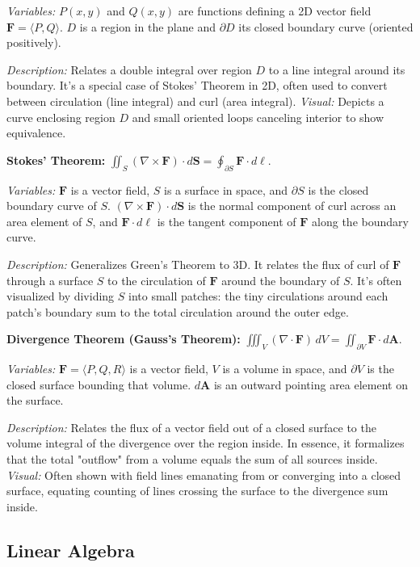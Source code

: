 \documentclass{article}
\begin{document}
\textit{Variables:} $P(x,y)$ and $Q(x,y)$ are functions defining a 2D vector field $\mathbf{F}=\langle P,Q\rangle$. $D$ is a region in the plane and $\partial D$ its closed boundary curve (oriented positively).

\textit{Description:} Relates a double integral over region $D$ to a line integral around its boundary. It’s a special case of Stokes’ Theorem in 2D, often used to convert between circulation (line integral) and curl (area integral). \textit{Visual:} Depicts a curve enclosing region $D$ and small oriented loops canceling interior to show equivalence.

\textbf{Stokes’ Theorem:} $\displaystyle \iint_{S} (\nabla \times \mathbf{F})\cdot d\mathbf{S} = \oint_{\partial S} \mathbf{F}\cdot d\mathbf{\ell}$.

\textit{Variables:} $\mathbf{F}$ is a vector field, $S$ is a surface in space, and $\partial S$ is the closed boundary curve of $S$. $(\nabla \times \mathbf{F})\cdot d\mathbf{S}$ is the normal component of curl across an area element of $S$, and $\mathbf{F}\cdot d\mathbf{\ell}$ is the tangent component of $\mathbf{F}$ along the boundary curve.

\textit{Description:} Generalizes Green’s Theorem to 3D. It relates the flux of curl of $\mathbf{F}$ through a surface $S$ to the circulation of $\mathbf{F}$ around the boundary of $S$. It’s often visualized by dividing $S$ into small patches: the tiny circulations around each patch’s boundary sum to the total circulation around the outer edge.

\textbf{Divergence Theorem (Gauss’s Theorem):} $\displaystyle \iiint_{V} (\nabla \cdot \mathbf{F})\,dV = \iint_{\partial V} \mathbf{F}\cdot d\mathbf{A}$.

\textit{Variables:} $\mathbf{F}=\langle P,Q,R\rangle$ is a vector field, $V$ is a volume in space, and $\partial V$ is the closed surface bounding that volume. $d\mathbf{A}$ is an outward pointing area element on the surface.

\textit{Description:} Relates the flux of a vector field out of a closed surface to the volume integral of the divergence over the region inside. In essence, it formalizes that the total "outflow" from a volume equals the sum of all sources inside. \textit{Visual:} Often shown with field lines emanating from or converging into a closed surface, equating counting of lines crossing the surface to the divergence sum inside.

\subsection*{Linear Algebra}
\end{document}
